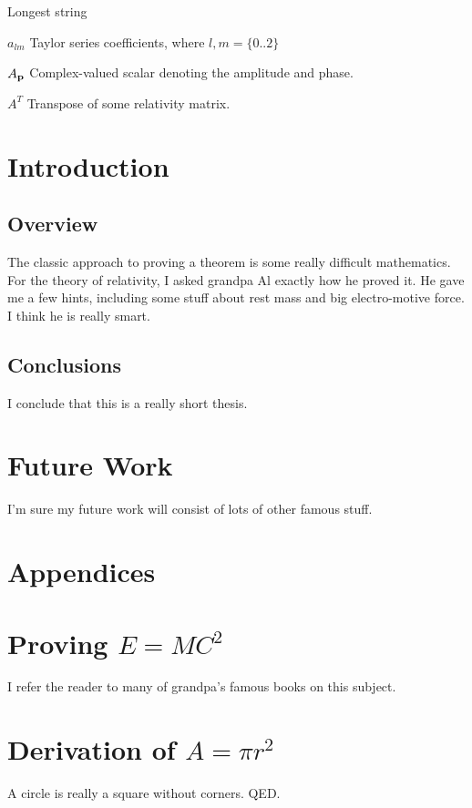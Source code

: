 \documentclass[botnum, fleqn]{unmeethesis}
\begin{document}
  \tableofcontents
  \listoffigures
  \listoftables

  \begin{glossary}{Longest  string}
    \item[$a_{lm}$]
    Taylor series coefficients, where $l,m = \{0..2\}$
    \item[$A_{\bf{p}}$]
    Complex-valued scalar denoting the amplitude and phase.
    \item[$A^T$]
    Transpose of some relativity matrix.
  \end{glossary}

  \mainmatter

  \chapter{Introduction}
  \section{\label{section:overview}Overview}
  The classic approach to proving a theorem is some really difficult
  mathematics.  For the theory of relativity, I asked grandpa Al exactly
  how he proved it.  He gave me a few hints, including some stuff about
  rest mass and big electro-motive force.  I think he is really smart.
  \section{Conclusions}
  I conclude that this is a really short thesis.

  \chapter{Future Work}
  I'm sure my future work will consist of lots of other famous stuff.

  \chapter*{Appendices}


  \appendix
  \chapter{Proving $E=MC^2$}
  I refer the reader to many of grandpa's famous books on this subject.
  \chapter{Derivation of $A = \pi r^2$}
  A circle is really a square without corners.  QED.

\end{document}
